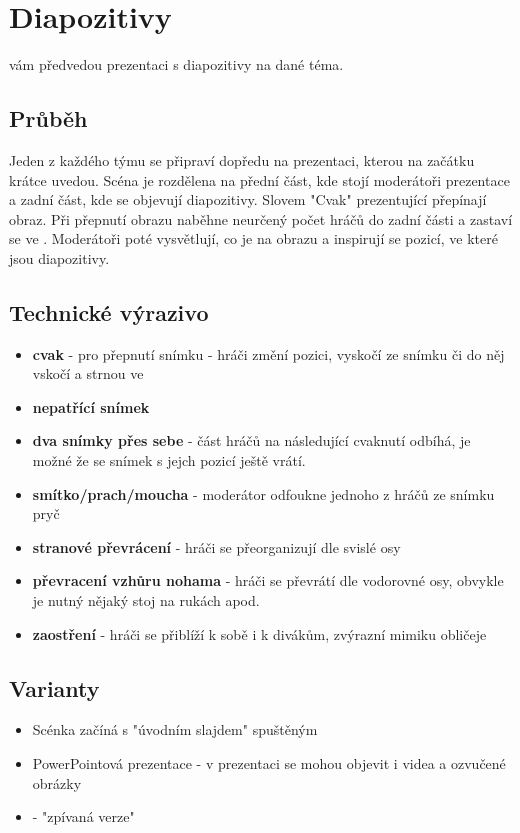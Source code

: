 \documentclass[main.tex]{subfiles}
\begin{document}
 
 
 
 
\needspace{5cm} \section{Diapozitivy} \label{diapozitivy}  
 
 vám předvedou prezentaci s diapozitivy na dané téma. 
 
\subsection{ Průběh } Jeden  z každého týmu se připraví dopředu na prezentaci, kterou na začátku krátce uvedou. Scéna je rozdělena na přední část, kde stojí moderátoři prezentace a zadní část, kde se objevují diapozitivy. Slovem "Cvak"{} prezentující přepínají obraz. Při přepnutí obrazu naběhne neurčený počet hráčů do zadní části a zastaví se ve . Moderátoři poté vysvětlují, co je na obrazu a inspirují se pozicí, ve které jsou diapozitivy. 
 
\subsection{ Technické výrazivo } \begin{itemize}
\item \textbf{cvak}{} - pro přepnutí snímku  - hráči změní pozici, vyskočí ze snímku či do něj vskočí a strnou ve 
\item \textbf{nepatřící snímek}{}
\item \textbf{dva snímky přes sebe}{} - část hráčů na následující cvaknutí odbíhá, je možné že se snímek s jejch pozicí ještě vrátí.
\item \textbf{smítko/prach/moucha}{} - moderátor odfoukne jednoho z hráčů ze snímku pryč
\item \textbf{stranové převrácení}{} - hráči se přeorganizují dle svislé osy
\item \textbf{převracení vzhůru nohama}{} - hráči se převrátí dle vodorovné osy, obvykle je nutný nějaký stoj na rukách apod.
\item \textbf{zaostření}{} - hráči se přiblíží k sobě i k divákům, zvýrazní mimiku obličeje
\end{itemize}
 
\subsection{ Varianty } \begin{itemize}
\item Scénka začíná s  "úvodním slajdem"{} spuštěným
\item PowerPointová prezentace - v prezentaci se mohou objevit i videa a ozvučené obrázky
\item {} - "zpívaná verze"
\end{itemize}
 
\end{document}
